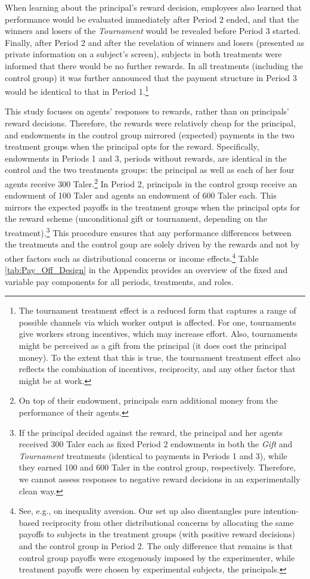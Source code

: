 When learning about the principal's reward decision, employees  also learned that performance
would be evaluated immediately after Period 2 ended, and that the winners and 
losers of the \textit{Tournament} 
would be revealed before Period 3 started. Finally, after Period 2 and after the revelation 
of winners and losers (presented as private information on a subject's screen), 
subjects in both treatments  were 
informed that there would be no further rewards.  In all treatments (including the control group) it 
was further announced that the payment structure in Period 3 would be identical to that  in Period 1.\footnote{The tournament treatment effect is a reduced form that captures a range of possible channels via which worker output is affected. For one, tournaments give workers strong incentives, which may increase effort. Also, tournaments might be perceived as a gift from the principal (it does cost the principal money). To the extent that this is true, the tournament treatment effect also reflects the combination of incentives, reciprocity, and any other factor that might be at work.  }

This study  focuses on agents' responses to rewards, rather than on 
principals' reward decisions. Therefore, the rewards were relatively cheap for the principal, and 
endowments in the control group mirrored 
(expected) payments in the two treatment groups when the principal opts for the reward. Specifically,
endowments in Periods 1 and 3, periods without rewards, are identical in the 
control and the two treatments groups:
the principal as well as each of her four agents receive 300 Taler.\footnote{On top of their endowment, principals earn additional money from the performance of their agents.}
In Period 2, principals in the control group receive an endowment of 100 Taler and agents an 
endowment of 600 Taler each. This  mirrors the expected payoffs in the treatment groups when the principal opts for the reward scheme (unconditional gift or tournament, depending on the treatment).\footnote{If the principal decided against the reward, the principal and her agents 
received 300 Taler each as fixed Period 2 endowments 
in both the \textit{Gift} and \textit{Tournament} treatments (identical to payments in Periods 1 and 3), 
while they 
earned 100 and 600 Taler in the 
control group, respectively. Therefore, we 
cannot assess responses to negative reward decisions in an experimentally clean way.}
This procedure ensures that any performance differences between the treatments and the 
control goup are solely driven 
by the rewards and not by other factors such as distributional concerns 
or income effects.\footnote{See, e.g., 
\cite{Fehr1999} on inequality aversion. Our set up also disentangles  
pure intention-based reciprocity from other distributional concerns \citep{Charness2004}
by allocating the same payoffs to subjects in the treatment groups (with positive reward decisions)
 and the control group in Period 2. The only difference that remains is that control group  payoffs were
exogenously imposed by the experimenter, while treatment payoffs were 
chosen by experimental subjects, the principals. } 
Table \ref{tab:Pay_Off_Design} in the Appendix provides an overview of the fixed and 
variable pay components for all periods, treatments, and roles. 

